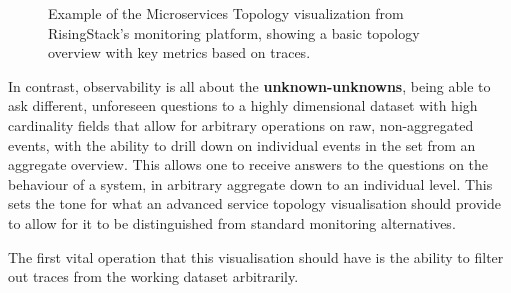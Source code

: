 \documentclass[12pt,pdftex,titlepage]{report}
\begin{document}
                \begin{figure}[hbt!]
                    \centering
                    \caption{Example of the Microservices Topology visualization from RisingStack's monitoring platform, showing a basic topology overview with key metrics based on traces.}
                    \label{fig:risingstacktopo}
                \end{figure}

                In contrast, observability is all about the \textbf{unknown-unknowns}, being able to ask different, unforeseen questions to a highly dimensional dataset with high cardinality fields that allow
                for arbitrary operations on raw, non-aggregated events, with the ability to drill down on individual events in the set from an aggregate overview. This allows one to receive answers to the questions 
                on the behaviour of a system, in arbitrary aggregate down to an individual level. This sets the tone for what an advanced service topology visualisation should provide to allow for it to be distinguished 
                from standard monitoring alternatives. 

                The first vital operation that this visualisation should have is the ability to filter out traces from the working dataset arbitrarily. 

\end{document}
